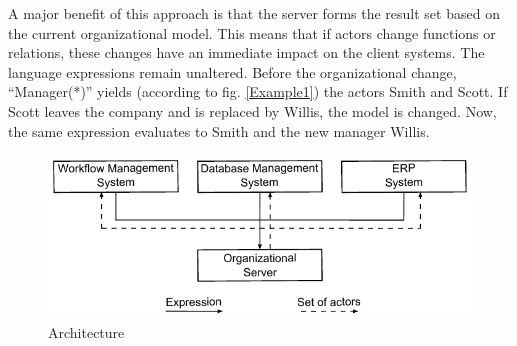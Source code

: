 A major benefit of this approach is that the server forms the result set based on the current organizational model. This means that if actors change functions or relations, these changes have an immediate impact on the client systems. The language expressions remain unaltered. Before the organizational change, ``Manager(*)'' yields (according to fig. \ref{Example1}) the actors Smith and Scott. If Scott leaves the company and is replaced by Willis, the model is changed. Now, the same expression evaluates to Smith and the new manager Willis.

	\begin{figure}[htb!]
	\centering
	\includegraphics[scale=0.9]{Figures/architecture.pdf}
	\caption{Architecture}
	\label{architecture}
	\end{figure}

